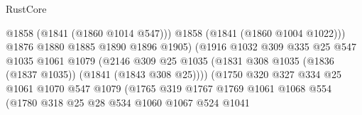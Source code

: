 \begin{lexlean}{RustCore}
\begin{coremodule}
                                            @1858
                                            (@1841 (@1860 @1014 @547)))
                                          @1858
                                          (@1841 (@1860 @1004 @1022)))
                                        @1876
                                        @1880
                                        @1885
                                        @1890
                                        @1896
                                        @1905)
                                      (@1916
                                        @1032
                                        @309
                                        @335
                                        @25
                                        @547
                                        @1035
                                        @1061
                                        @1079
                                        (@2146
                                          @309
                                          @25
                                          @1035
                                          (@1831
                                            @308
                                            @1035
                                            (@1836 (@1837 @1035))
                                            (@1841 (@1843 @308 @25))))
                                        (@1750
                                          @320
                                          @327
                                          @334
                                          @25
                                          @1061
                                          @1070
                                          @547
                                          @1079
                                          (@1765
                                            @319
                                            @1767
                                            @1769
                                            @1061
                                            @1068
                                            @554
                                            (@1780
                                              @318
                                              @25
                                              @28
                                              @534
                                              @1060
                                              @1067
                                              @524
                                              @1041

\end{coremodule}
\end{lexlean}

